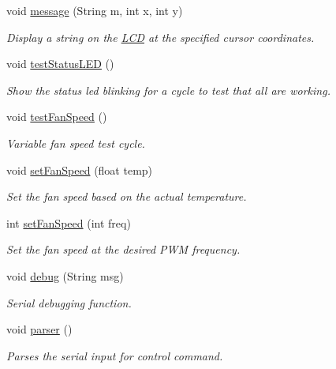 \begin{DoxyCompactItemize}
void \hyperlink{_meditech___chip_kit_control_panel_8pde_ae1956b5b6310b3339e72931911b84e3f}{message} (String m, int x, int y)
\begin{DoxyCompactList}\small\item\em Display a string on the \hyperlink{class_l_c_d}{L\-C\-D} at the specified cursor coordinates. \end{DoxyCompactList}\item 
void \hyperlink{_meditech___chip_kit_control_panel_8pde_af1a6bbf84a5ea76623bdc49aaf642a28}{test\-Status\-L\-E\-D} ()
\begin{DoxyCompactList}\small\item\em Show the status led blinking for a cycle to test that all are working. \end{DoxyCompactList}\item 
void \hyperlink{_meditech___chip_kit_control_panel_8pde_a697689ffa626676db9a1abb5e6662762}{test\-Fan\-Speed} ()
\begin{DoxyCompactList}\small\item\em Variable fan speed test cycle. \end{DoxyCompactList}\item 
void \hyperlink{_meditech___chip_kit_control_panel_8pde_ac0f1975168c58bd48fc29f8e3004a5a8}{set\-Fan\-Speed} (float temp)
\begin{DoxyCompactList}\small\item\em Set the fan speed based on the actual temperature. \end{DoxyCompactList}\item 
int \hyperlink{_meditech___chip_kit_control_panel_8pde_aac6d40e9f46456f3b2d16f2fe64004cc}{set\-Fan\-Speed} (int freq)
\begin{DoxyCompactList}\small\item\em Set the fan speed at the desired P\-W\-M frequency. \end{DoxyCompactList}\item 
void \hyperlink{_meditech___chip_kit_control_panel_8pde_ad5b3677e61ca769d9d9e5cf9cfa1b33c}{debug} (String msg)
\begin{DoxyCompactList}\small\item\em Serial debugging function. \end{DoxyCompactList}\item 
void \hyperlink{_meditech___chip_kit_control_panel_8pde_ac15f7c36f6055edec43d0f0f611c4dc0}{parser} ()
\begin{DoxyCompactList}\small\item\em Parses the serial input for control command. \end{DoxyCompactList}\item 

\end{DoxyCompactItemize}
